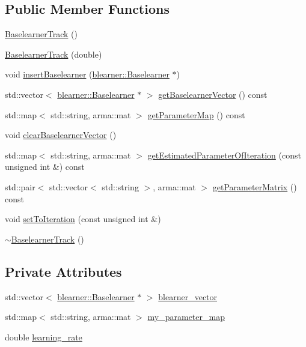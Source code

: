 \subsection*{Public Member Functions}
\begin{DoxyCompactItemize}
\item 
\hyperlink{classblearnertrack_1_1_baselearner_track_ad90a0f286fab221aa2f2ed6401861187}{Baselearner\+Track} ()
\item 
\hyperlink{classblearnertrack_1_1_baselearner_track_aaba614b8351a3e5401d3f924059efc65}{Baselearner\+Track} (double)
\item 
void \hyperlink{classblearnertrack_1_1_baselearner_track_abc5f42093449e665b5b0dfeee8570953}{insert\+Baselearner} (\hyperlink{classblearner_1_1_baselearner}{blearner\+::\+Baselearner} $\ast$)
\item 
std\+::vector$<$ \hyperlink{classblearner_1_1_baselearner}{blearner\+::\+Baselearner} $\ast$ $>$ \hyperlink{classblearnertrack_1_1_baselearner_track_a596429982bd5fb1c8ffabc5f93849235}{get\+Baselearner\+Vector} () const
\item 
std\+::map$<$ std\+::string, arma\+::mat $>$ \hyperlink{classblearnertrack_1_1_baselearner_track_a0ba8e3943b998b58375b892f40f12c73}{get\+Parameter\+Map} () const
\item 
void \hyperlink{classblearnertrack_1_1_baselearner_track_aa178f9d817a01240b6f39075f1f445f2}{clear\+Baselearner\+Vector} ()
\item 
std\+::map$<$ std\+::string, arma\+::mat $>$ \hyperlink{classblearnertrack_1_1_baselearner_track_a9b0678ef3573206959be2068d115c556}{get\+Estimated\+Parameter\+Of\+Iteration} (const unsigned int \&) const
\item 
std\+::pair$<$ std\+::vector$<$ std\+::string $>$, arma\+::mat $>$ \hyperlink{classblearnertrack_1_1_baselearner_track_a4b6d2d8b585148c71ed5b6055c9ab08c}{get\+Parameter\+Matrix} () const
\item 
void \hyperlink{classblearnertrack_1_1_baselearner_track_a06f0ac986a158eecddce64e6c7af0750}{set\+To\+Iteration} (const unsigned int \&)
\item 
\hyperlink{classblearnertrack_1_1_baselearner_track_a93e9a1268d46808b9d6fe768fa11e22a}{$\sim$\+Baselearner\+Track} ()
\end{DoxyCompactItemize}
\subsection*{Private Attributes}
\begin{DoxyCompactItemize}
\item 
std\+::vector$<$ \hyperlink{classblearner_1_1_baselearner}{blearner\+::\+Baselearner} $\ast$ $>$ \hyperlink{classblearnertrack_1_1_baselearner_track_ad37a3a99c04778146256e50c44f2a292}{blearner\+\_\+vector}
\item 
std\+::map$<$ std\+::string, arma\+::mat $>$ \hyperlink{classblearnertrack_1_1_baselearner_track_a3725470c87e28ea32d4b184f1e6aad39}{my\+\_\+parameter\+\_\+map}
\item 
double \hyperlink{classblearnertrack_1_1_baselearner_track_a62d743fe6171c52410e2f5da3dc58ffb}{learning\+\_\+rate}
\end{DoxyCompactItemize}


